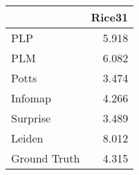 \begin{tabular}{lr}
\toprule
{} & Rice31 \\
\midrule
PLP          &  5.918 \\
PLM          &  6.082 \\
Potts        &  3.474 \\
Infomap      &  4.266 \\
Surprise     &  3.489 \\
Leiden       &  8.012 \\
Ground Truth &  4.315 \\
\bottomrule
\end{tabular}
